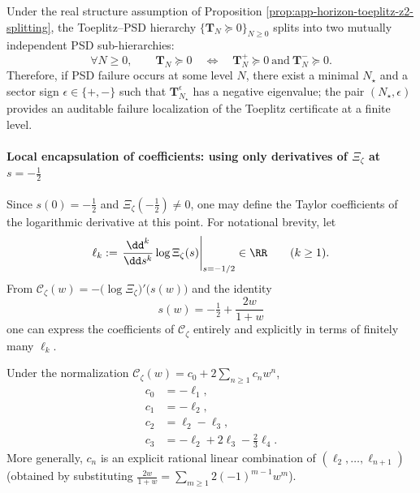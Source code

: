 \begin{corollary}\label{cor:app-horizon-toeplitz-z2-cert-split}
Under the real structure assumption of Proposition \ref{prop:app-horizon-toeplitz-z2-splitting}, the Toeplitz--PSD hierarchy
\(\{\mathbf{T}_N\succeq 0\}_{N\ge 0}\)
splits into two mutually independent PSD sub-hierarchies:
\[
\forall N\ge 0,\qquad
\mathbf{T}_N\succeq 0
\quad\Longleftrightarrow\quad
\mathbf{T}_N^{+}\succeq 0\ \text{and}\ \mathbf{T}_N^{-}\succeq 0.
\]
Therefore, if PSD failure occurs at some level \(N\), there exist a minimal \(N_\star\) and a sector sign \(\epsilon\in\{+,-\}\) such that \(\mathbf{T}_{N_\star}^{\epsilon}\) has a negative eigenvalue; the pair \((N_\star,\epsilon)\) provides an auditable failure localization of the Toeplitz certificate at a finite level.
\end{corollary}

\paragraph{Local encapsulation of coefficients: using only derivatives of \texorpdfstring{$\Xi_{\zeta}$}{Xi_zeta} at \texorpdfstring{$s=-\tfrac12$}{s=-1/2}}
Since \(s(0)=-\tfrac12\) and \(\Xi_{\zeta}(-\tfrac12)\neq 0\), one may define the Taylor coefficients of the logarithmic derivative at this point.
For notational brevity, let
\[
\ell_k:=\left.\frac{\dd^k}{\dd s^k}\log\Xi_{\zeta}(s)\right|_{s=-1/2}\in\RR
\qquad(k\ge 1).
\]
From \(\mathscr{C}_{\zeta}(w)=-\bigl(\log\Xi_{\zeta}\bigr)'\!\bigl(s(w)\bigr)\) and the identity
\begin{equation}\label{eq:app-horizon-s-of-w-shift}
s(w)=-\tfrac12+\frac{2w}{1+w}
\end{equation}
one can express the coefficients of \(\mathscr{C}_{\zeta}\) entirely and explicitly in terms of finitely many \(\ell_k\).

\begin{proposition}\label{prop:app-horizon-coeff-local}
Under the normalization \(\mathscr{C}_{\zeta}(w)=c_0+2\sum_{n\ge 1}c_n w^n\),
\begin{equation}\label{eq:app-horizon-c0c3}
\begin{aligned}
c_0&=-\ell_1,\\
c_1&=-\ell_2,\\
c_2&=\ell_2-\ell_3,\\
c_3&=-\ell_2+2\ell_3-\tfrac23\ell_4.
\end{aligned}
\end{equation}
More generally, \(c_n\) is an explicit rational linear combination of \((\ell_2,\dots,\ell_{n+1})\) (obtained by substituting \(\frac{2w}{1+w}=\sum_{m\ge 1}2(-1)^{m-1}w^m\)).
\end{proposition}

